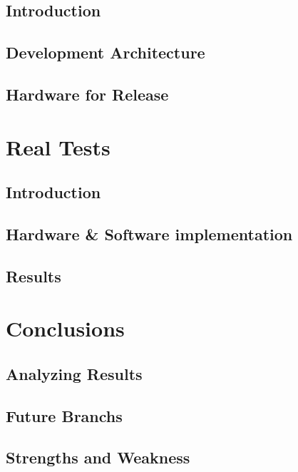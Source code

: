 \documentclass{book} %
\begin{document}
\section{Introduction}
\section{Development Architecture}
\section{Hardware for Release}

\chapter{Real Tests}
\section{Introduction}
\section{Hardware \& Software implementation}
\section{Results}

\chapter{Conclusions} \label{chap:c6_conclusions}
\section{Analyzing Results}
\section{Future Branchs}
\section{Strengths and Weakness}

\listoffigures{}
\end{document}
